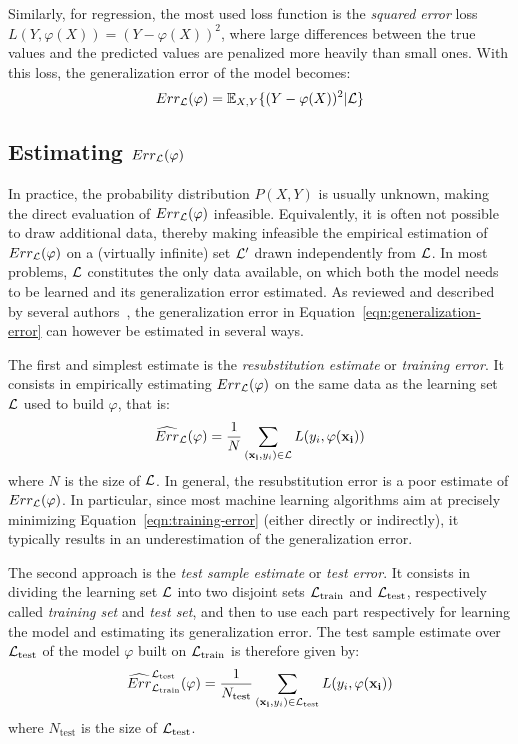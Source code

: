 Similarly, for regression, the most used loss function is the \textit{squared
error} loss $L(Y, \varphi(X)) = (Y - \varphi(X))^2$, where large differences
between the true values and the predicted values are penalized more heavily
than small ones. With this loss, the generalization error of the model becomes:
\begin{equation}
Err_{\cal L}(\varphi) = \mathbb{E}_{X, Y}\{ (Y - \varphi(X))^2 | {\cal L} \}
\end{equation}

\subsection{Estimating $Err_{\cal L}(\varphi)$}

In practice, the probability distribution $P(X, Y)$ is usually unknown, making
the direct evaluation of $Err_{\cal L}(\varphi)$ infeasible. Equivalently, it is often
not possible to draw additional data, thereby making infeasible the empirical
estimation of $Err_{\cal L}(\varphi)$ on a (virtually infinite) set ${\cal L}'$ drawn
independently from ${\cal L}$. In most problems, ${\cal L}$ constitutes the
only data available, on which both the model needs to be learned and its
generalization error estimated.
As reviewed and described by several
authors~\citep{toussaint:1974,nadeau:2003,arlot:2010}, the generalization error
in Equation~\ref{eqn:generalization-error} can however be estimated in several ways.

The first and simplest estimate is the \textit{resubstitution estimate} or \textit{training error}. It
consists in empirically estimating $Err_{\cal L}(\varphi)$ on the same data as the
learning set ${\cal L}$ used to build $\varphi$, that is:
\begin{equation}\label{eqn:training-error}
\widehat{Err}_{\cal L}(\varphi) = \frac{1}{N} \sum_{(\mathbf{x_i}, y_i) \in {\cal L}} L(y_i, \varphi(\mathbf{x_i}))
\end{equation}
where $N$ is the size of ${\cal L}$.
In general, the resubstitution error is a poor estimate of
$Err_{\cal L}(\varphi)$. In particular, since most machine learning algorithms
aim at precisely minimizing Equation~\ref{eqn:training-error} (either directly
or indirectly), it typically results in an underestimation of the
generalization error.

The second approach is the \textit{test sample estimate} or \textit{test error}. It consists in
dividing the learning set ${\cal L}$ into two disjoint sets ${\cal
L}_\text{train}$ and ${\cal L}_\text{test}$, respectively called
\textit{training set} and \textit{test set}, and then to use each part
respectively for learning the model and estimating its generalization error.
The test sample estimate over ${\cal L}_\text{test}$ of the model $\varphi$ built on ${\cal L}_\text{train}$ is therefore given by:
\begin{equation}\label{eqn:test-error}
\widehat{Err}_{{\cal L}_\text{train}}^{{\cal L}_\text{test}}(\varphi) = \frac{1}{N_\text{test}} \sum_{(\mathbf{x_i}, y_i) \in {\cal L}_\text{test}} L(y_i, \varphi(\mathbf{x_i}))
\end{equation}
where $N_\text{test}$ is the size of ${\cal L}_\text{test}$.


